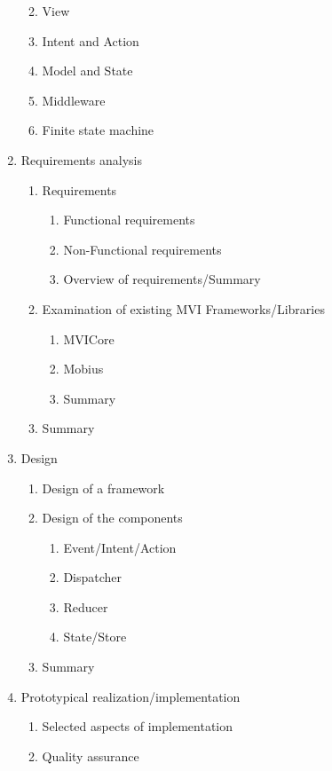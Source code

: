 \begin{enumerate}
\begin{enumerate}
\begin{enumerate}
			\end{enumerate}
			\item View
			\item Intent and Action
			\item Model and State
			\item Middleware
			\item Finite state machine
		\end{enumerate}	
	\item Requirements analysis
		\begin{enumerate}
			\item Requirements
		\begin{enumerate}
			\item Functional requirements
			\item Non-Functional requirements
			\item Overview of requirements/Summary
		\end{enumerate}
		\item Examination of existing  MVI Frameworks/Libraries
		\begin{enumerate}
			\item MVICore
			\item Mobius
			\item Summary
		\end{enumerate}
			\item Summary
		\end{enumerate}
	\item Design
	\begin{enumerate}
		\item Design of a framework
		\item Design of the components
		\begin{enumerate}
			\item Event/Intent/Action
			\item Dispatcher
			\item Reducer
			\item State/Store
		\end{enumerate}
		\item Summary
	\end{enumerate}
	\item Prototypical realization/implementation
	\begin{enumerate}
		\item Selected aspects of implementation
		\item Quality assurance
		\begin{enumerate}

\end{enumerate}
\end{enumerate}
\end{enumerate}
